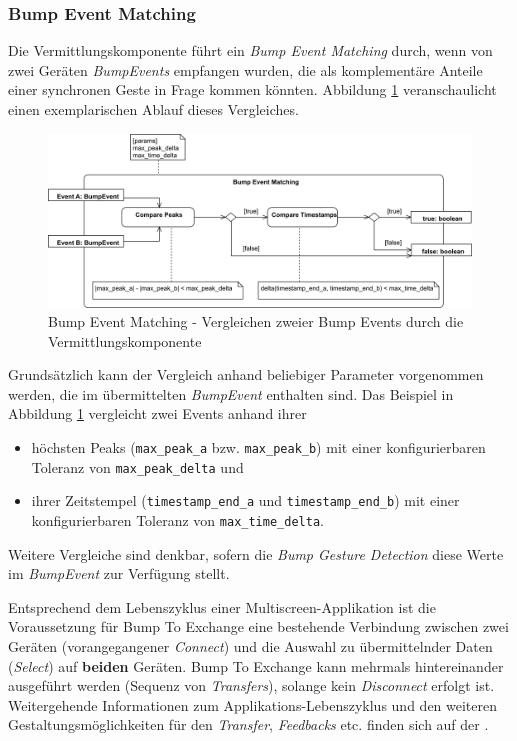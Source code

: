 {\subsubsection*{Bump Event Matching}
Die Vermittlungskomponente führt ein \textit{Bump Event Matching} durch, wenn von zwei Geräten \textit{BumpEvents} empfangen wurden, die als komplementäre Anteile einer synchronen Geste in Frage kommen könnten. Abbildung \ref{bump_event_matching} veranschaulicht einen exemplarischen Ablauf dieses Vergleiches.

\begin{figure}[H]
\includegraphics[width=\textwidth]{bump_event_matching.png}
\caption{Bump Event Matching - Vergleichen zweier Bump Events durch die Vermittlungskomponente}
\label{bump_event_matching}
\end{figure}

Grundsätzlich kann der Vergleich anhand beliebiger Parameter vorgenommen werden, die im übermittelten \textit{BumpEvent} enthalten sind. Das Beispiel in Abbildung \ref{bump_event_matching} vergleicht zwei Events anhand ihrer
\begin{itemize}
\item höchsten Peaks (\texttt{max\_peak\_a} bzw. \texttt{max\_peak\_b}) mit einer konfigurierbaren Toleranz von \texttt{max\_peak\_delta} und
\item ihrer Zeitstempel (\texttt{timestamp\_end\_a} und \texttt{timestamp\_end\_b}) mit einer  konfigurierbaren Toleranz von \texttt{max\_time\_delta}.
\end{itemize} 

Weitere Vergleiche sind denkbar, sofern die \textit{Bump Gesture Detection} diese Werte im \textit{BumpEvent} zur Verfügung stellt.

Entsprechend dem Lebenszyklus einer Multiscreen-Applikation ist die Voraussetzung für Bump To Exchange eine bestehende Verbindung zwischen zwei Geräten (vorangegangener \textit{Connect}) und die Auswahl zu übermittelnder Daten (\textit{Select}) auf \textbf{beiden} Geräten. Bump To Exchange kann mehrmals hintereinander ausgeführt werden (Sequenz von \textit{Transfers}), solange kein \textit{Disconnect} erfolgt ist. \\

Weitergehende Informationen zum Applikations-Lebenszyklus und den weiteren
Gestaltungsmöglichkeiten für den \textit{Transfer}, \textit{Feedbacks} etc. finden sich
auf der \developerpage.
}



